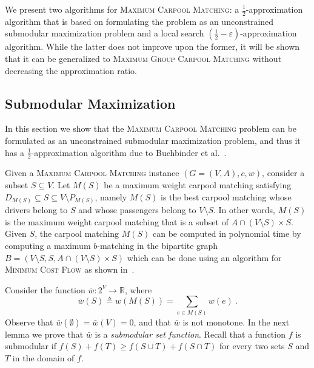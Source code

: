 \documentclass[11pt]{article}
\newcommand{\eqdf}{\triangleq}
\def\R{\mathbb{R}}
\newcommand{\carpool}{\textsc{Maximum Carpool Matching}\xspace}
\newcommand{\gcp}{\textsc{Maximum Group Carpool Matching}\xspace}
\newcommand{\barw}{\bar{w}}
\begin{document}
We present two algorithms for \carpool: a $\frac{1}{2}$-approximation
algorithm that is based on formulating the problem as an unconstrained
submodular maximization problem and a local search $(\frac{1}{2} -
\varepsilon)$-approximation algorithm.  While the latter does not
improve upon the former, it will be shown
that it can be generalized to \gcp without decreasing the
approximation ratio.


\subsection{Submodular Maximization}
\label{sec:sub}

In this section we show that the \carpool problem can be formulated as
an unconstrained submodular maximization problem, and thus it has a
$\frac{1}{2}$-approximation algorithm due to Buchbinder et
al.~\cite{BFNS15,buchbinder2016deterministic}.

Given a \carpool instance $(G = (V,A), c, w)$, consider a subset
$S \subseteq V$.  Let $M(S)$ be a maximum weight carpool matching
satisfying $D_{M(S)} \subseteq S \subseteq V \setminus P_{M(S)}$,
namely $M(S)$ is the best carpool matching whose drivers belong to $S$
and whose passengers belong to $V \setminus S$.  In other words,
$M(S)$ is the maximum weight carpool matching that is a subset of
$A \cap (V \setminus S) \times S$.
%
Given $S$, the carpool matching $M(S)$ can be computed in polynomial
time by computing a maximum $b$-matching in the bipartite graph $B =
(V \setminus S, S, A \cap (V \setminus S) \times S)$ which can be done
using an algorithm for \textsc{Minimum Cost Flow} as shown
in~\cite{kutiel2017}.

Consider the function $\barw: 2^V \to \R$, where
\[
\barw(S) \eqdf w(M(S)) = \sum_{e \in M(S)} w(e)
~.
\]
Observe that $\barw(\emptyset) = \barw(V) = 0$, and that $\barw$ is
not monotone.
%
In the next lemma we prove that $\bar{w}$ is a \emph{submodular set
function}.  Recall that a function $f$ is submodular if $f(S) +
f(T) \geq f(S \cup T) + f(S \cap T)$ for every two sets $S$ and $T$ in
the domain of $f$.
\end{document}
